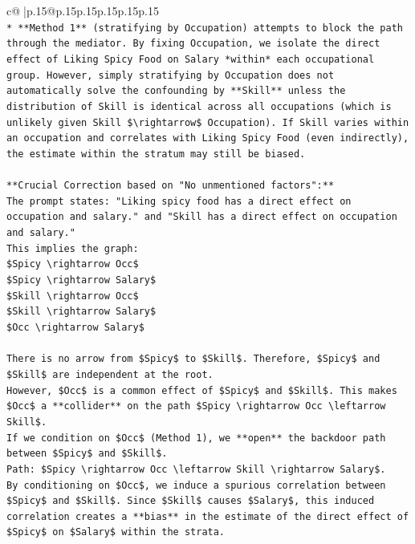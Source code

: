 \documentclass{article}
\begin{document}
{\begin{supertabular}{c@{$\;$}|p{.15\linewidth}@{}p{.15\linewidth}p{.15\linewidth}p{.15\linewidth}p{.15\linewidth}p{.15\linewidth}}
{{{\\ 
\texttt{*   **Method 1** (stratifying by Occupation) attempts to block the path through the mediator. By fixing Occupation, we isolate the direct effect of Liking Spicy Food on Salary *within* each occupational group. However, simply stratifying by Occupation does not automatically solve the confounding by **Skill** unless the distribution of Skill is identical across all occupations (which is unlikely given Skill \$\textbackslash{}rightarrow\$ Occupation). If Skill varies within an occupation and correlates with Liking Spicy Food (even indirectly), the estimate within the stratum may still be biased.} \\
\\ 
\texttt{**Crucial Correction based on "No unmentioned factors":**} \\
\texttt{The prompt states: "Liking spicy food has a direct effect on occupation and salary." and "Skill has a direct effect on occupation and salary."} \\
\texttt{This implies the graph:} \\
\texttt{\$Spicy \textbackslash{}rightarrow Occ\$} \\
\texttt{\$Spicy \textbackslash{}rightarrow Salary\$} \\
\texttt{\$Skill \textbackslash{}rightarrow Occ\$} \\
\texttt{\$Skill \textbackslash{}rightarrow Salary\$} \\
\texttt{\$Occ \textbackslash{}rightarrow Salary\$} \\
\\ 
\texttt{There is no arrow from \$Spicy\$ to \$Skill\$. Therefore, \$Spicy\$ and \$Skill\$ are independent at the root.} \\
\texttt{However, \$Occ\$ is a common effect of \$Spicy\$ and \$Skill\$. This makes \$Occ\$ a **collider** on the path \$Spicy \textbackslash{}rightarrow Occ \textbackslash{}leftarrow Skill\$.} \\
\texttt{If we condition on \$Occ\$ (Method 1), we **open** the backdoor path between \$Spicy\$ and \$Skill\$.} \\
\texttt{Path: \$Spicy \textbackslash{}rightarrow Occ \textbackslash{}leftarrow Skill \textbackslash{}rightarrow Salary\$.} \\
\texttt{By conditioning on \$Occ\$, we induce a spurious correlation between \$Spicy\$ and \$Skill\$. Since \$Skill\$ causes \$Salary\$, this induced correlation creates a **bias** in the estimate of the direct effect of \$Spicy\$ on \$Salary\$ within the strata.} \\
}}}
\end{supertabular}}
\end{document}
